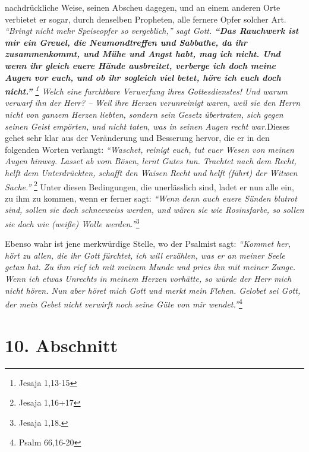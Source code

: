 nachdrückliche Weise, seinen Abscheu dagegen, und an einem anderen Orte
verbietet
er sogar, durch denselben Propheten, alle fernere Opfer solcher Art.
\textit{\textit{"`Bringt nicht mehr Speiseopfer so vergeblich,"'} sagt Gott.
\label{ref:06_09_gebetserhoerung}
\textbf{"`Das Rauchwerk ist mir ein Greuel, die Neumondtreffen und Sabbathe, da
ihr
zusammenkommt, und Mühe und Angst habt, mag ich nicht. Und wenn ihr gleich euere
Hände ausbreitet, verberge ich doch meine Augen vor euch, und ob ihr sogleich
viel
betet, höre ich euch doch nicht."'} \footnote{Jesaja
1,13-15}
Welch eine
furchtbare Verwerfung ihres Gottesdienstes! Und warum verwarf ihn der Herr? --
Weil ihre Herzen verunreinigt waren, weil sie den Herrn nicht von ganzem Herzen
liebten, sondern sein Gesetz übertraten, sich gegen seinen Geist empörten, und
nicht taten, was in seinen Augen recht war.}Dieses gehet sehr klar aus der
Veränderung und Besserung hervor, die er in den folgenden Worten verlangt:
\textit{"`Waschet, reinigt euch, tut euer Wesen von meinen Augen hinweg. Lasset
ab vom
Bösen, lernt Gutes tun. Trachtet nach dem Recht, helft dem Unterdrückten,
schafft den Waisen Recht und helft (führt) der Witwen Sache."'}
\footnote{Jesaja 1,16+17}
Unter diesen Bedingungen, die unerlässlich sind, ladet er nun alle ein,
zu ihm zu kommen, wenn er ferner sagt:
\textit{"`Wenn denn auch euere Sünden blutrot
sind, sollen sie doch schneeweiss werden, und wären sie wie Rosinsfarbe, so
sollen sie doch wie (weiße) Wolle werden."'}\footnote{Jesaja 1,18.}

\medskip

Ebenso wahr ist jene merkwürdige Stelle, wo der Psalmist sagt:
\textit{"`Kommet her,
hört zu allen, die ihr Gott fürchtet, ich will erzählen, was er an meiner Seele
getan hat. Zu ihm rief ich mit meinem Munde und pries ihn mit meiner Zunge.
Wenn ich etwas Unrechts in meinem Herzen vorhätte, so würde der Herr mich nicht
hören. Nun aber höret mich Gott und merkt mein Flehen. Gelobet sei Gott,
der mein Gebet nicht verwirft noch seine Güte von mir wendet."'}\footnote{Psalm
66,16-20}

\section{10. Abschnitt} \label{kap6_ab10}

